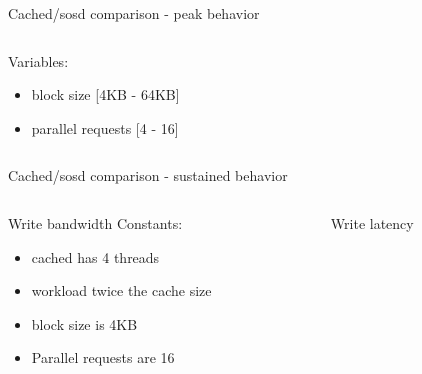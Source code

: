 \begin{frame}{Cached/sosd comparison - peak behavior}
\begin{columns}[t]
\begin{column}{.5\textwidth}
{			}
			Variables:
			\begin{itemize}
				\item block size [4KB - 64KB]
				\item parallel requests [4 - 16]
			\end{itemize}
		\end{column}
	\end{columns}

\end{frame}

\begin{frame}{Cached/sosd comparison - sustained behavior}
	\begin{columns}[t]
		\begin{column}{.5\textwidth}
			Write bandwidth
			Constants:
			\begin{itemize}
				\item cached has 4 threads
				\item workload twice the cache size
				\item block size is 4KB
				\item Parallel requests are 16
			\end{itemize}
		\end{column}
		\begin{column}{.5\textwidth}
			Write latency
\end{column}
\end{columns}
\end{frame}
